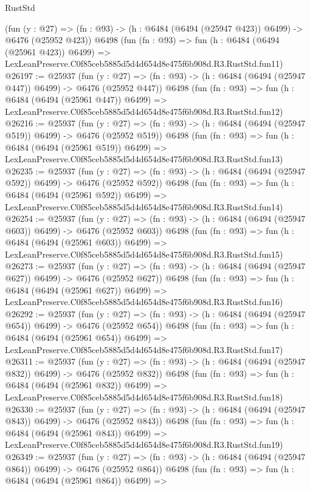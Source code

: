 \begin{lexlean}{RustStd}
\begin{coremodule}
    (fun (y : @27) => (fn : @93) -> (h : @6484 (@6494 (@25947 @423)) @6499) -> @6476 (@25952 @423))
    @6498
    (fun (fn : @93) =>
    fun (h : @6484 (@6494 (@25961 @423)) @6499) =>
    LexLeanPreserve.C0f85ceb5885d5d4d654d8e475f6b908d.R3.RustStd.fun11)
@26197 := @25937
    (fun (y : @27) => (fn : @93) -> (h : @6484 (@6494 (@25947 @447)) @6499) -> @6476 (@25952 @447))
    @6498
    (fun (fn : @93) =>
    fun (h : @6484 (@6494 (@25961 @447)) @6499) =>
    LexLeanPreserve.C0f85ceb5885d5d4d654d8e475f6b908d.R3.RustStd.fun12)
@26216 := @25937
    (fun (y : @27) => (fn : @93) -> (h : @6484 (@6494 (@25947 @519)) @6499) -> @6476 (@25952 @519))
    @6498
    (fun (fn : @93) =>
    fun (h : @6484 (@6494 (@25961 @519)) @6499) =>
    LexLeanPreserve.C0f85ceb5885d5d4d654d8e475f6b908d.R3.RustStd.fun13)
@26235 := @25937
    (fun (y : @27) => (fn : @93) -> (h : @6484 (@6494 (@25947 @592)) @6499) -> @6476 (@25952 @592))
    @6498
    (fun (fn : @93) =>
    fun (h : @6484 (@6494 (@25961 @592)) @6499) =>
    LexLeanPreserve.C0f85ceb5885d5d4d654d8e475f6b908d.R3.RustStd.fun14)
@26254 := @25937
    (fun (y : @27) => (fn : @93) -> (h : @6484 (@6494 (@25947 @603)) @6499) -> @6476 (@25952 @603))
    @6498
    (fun (fn : @93) =>
    fun (h : @6484 (@6494 (@25961 @603)) @6499) =>
    LexLeanPreserve.C0f85ceb5885d5d4d654d8e475f6b908d.R3.RustStd.fun15)
@26273 := @25937
    (fun (y : @27) => (fn : @93) -> (h : @6484 (@6494 (@25947 @627)) @6499) -> @6476 (@25952 @627))
    @6498
    (fun (fn : @93) =>
    fun (h : @6484 (@6494 (@25961 @627)) @6499) =>
    LexLeanPreserve.C0f85ceb5885d5d4d654d8e475f6b908d.R3.RustStd.fun16)
@26292 := @25937
    (fun (y : @27) => (fn : @93) -> (h : @6484 (@6494 (@25947 @654)) @6499) -> @6476 (@25952 @654))
    @6498
    (fun (fn : @93) =>
    fun (h : @6484 (@6494 (@25961 @654)) @6499) =>
    LexLeanPreserve.C0f85ceb5885d5d4d654d8e475f6b908d.R3.RustStd.fun17)
@26311 := @25937
    (fun (y : @27) => (fn : @93) -> (h : @6484 (@6494 (@25947 @832)) @6499) -> @6476 (@25952 @832))
    @6498
    (fun (fn : @93) =>
    fun (h : @6484 (@6494 (@25961 @832)) @6499) =>
    LexLeanPreserve.C0f85ceb5885d5d4d654d8e475f6b908d.R3.RustStd.fun18)
@26330 := @25937
    (fun (y : @27) => (fn : @93) -> (h : @6484 (@6494 (@25947 @843)) @6499) -> @6476 (@25952 @843))
    @6498
    (fun (fn : @93) =>
    fun (h : @6484 (@6494 (@25961 @843)) @6499) =>
    LexLeanPreserve.C0f85ceb5885d5d4d654d8e475f6b908d.R3.RustStd.fun19)
@26349 := @25937
    (fun (y : @27) => (fn : @93) -> (h : @6484 (@6494 (@25947 @864)) @6499) -> @6476 (@25952 @864))
    @6498
    (fun (fn : @93) =>
    fun (h : @6484 (@6494 (@25961 @864)) @6499) =>

\end{coremodule}
\end{lexlean}
